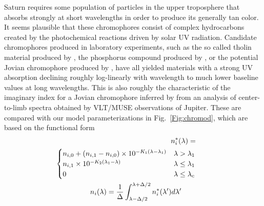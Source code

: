 \documentclass[article,11pt]{emulateapj}
\begin{document}
Saturn requires some population of particles in the upper troposphere
that absorbs strongly at short wavelengths in order to produce its
generally tan color.  It seems plausible that these
chromophores consist of complex hydrocarbons created by the
photochemical reactions driven by solar UV radiation.  Candidate
chromophores produced in laboratory experiments, such as the so called
tholin material produced by \cite{Khare1993}, the phosphorus compound
produced by \cite{Noy1981}, or the potential Jovian chromophore
produced by \cite{Carlson2016}, have all yielded materials with a
strong UV absorption declining roughly log-linearly with wavelength to
much lower baseline values at long wavelengths. This is also roughly
the characteristic of the imaginary index for a Jovian chromophore
inferred by \cite{Braude2018} from an analysis of center-to-limb
spectra obtained by VLT/MUSE observations of Jupiter.  These are
compared with our model parameterizations in Fig.\ \ref{Fig:chromod},
which are based on the functional form
\begin{eqnarray}
n_i^*(\lambda) = & \qquad \notag \\
 \begin{cases}
  n_{i,0} + ( n_{i,1} -  n_{i,0})\times 10^{-K_1 (\lambda - \lambda_1)} &
  \text{$\lambda > \lambda_1$}  \\ 
  n_{i,1} \times 10^{-K_2 (\lambda_1 - \lambda)} &
 \text{$\lambda \le \lambda_1$}\\
0 &  \text{$\lambda \le \lambda_c$}
 \end{cases}\label{Eq:chromod}\\
n_i(\lambda) = \frac{1}{\Delta}\int_{\lambda-\Delta/2}^{\lambda+\Delta/2}n_i^*(\lambda')d\lambda' \qquad \label{Eq:boxav}
\end{eqnarray}
\end{document}
